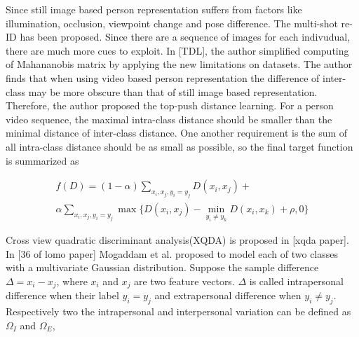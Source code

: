 Since still image based person representation suffers from factors like illumination, occlusion, viewpoint change and pose difference. The multi-shot re-ID has been proposed. Since there are a sequence of images for each indivudual, there are much more cues to exploit.
In [TDL], the author simplified computing of Mahananobis matrix by applying the new limitations on datasets. The author finds that when using video based person representation the difference of inter-class may be more obscure than that of still image based representation. Therefore, the author proposed the top-push distance learning. For a person video sequence, the maximal intra-class distance should be smaller than the minimal distance of inter-class distance. One another requirement is the sum of all intra-class distance should be as small as possible, so the final target function is summarized as 

\begin{equation}
\begin{aligned}
f(D) = (1-\alpha)\sum_{x_i,x_j,y_i=y_j} D(x_i,x_j) + \\
 \alpha \sum_{x_i,x_j,y_i=y_j}\max\{{D(x_i,x_j)-\min_{y_i\ne y_k}{D(x_i,x_k)}+\rho,0}\}
\end{aligned}
\end{equation}

Cross view quadratic discriminant analysis(XQDA) is proposed in [xqda paper]. In [36 of lomo paper] Mogaddam et al. proposed to model each of two classes with a multivariate Gaussian  distribution. Suppose the sample difference $\Delta = x_i - x_j$, where $x_i$ and $x_j$ are two feature vectors. $\Delta$ is called intrapersonal difference when their label $y_i = y_j$ and extrapersonal difference when $y_i \ne y_j$. Respectively two the intrapersonal and interpersonal variation can be defined as $\Omega_I$ and $\Omega_E$,


